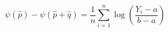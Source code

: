 

\[
\psi(\hat{p}) - \psi(\hat{p} + \hat{q}) = \frac{1}{n} \sum_{i=1}^{n}{\log(\frac{Y_i - a}{b - a})}
\]



